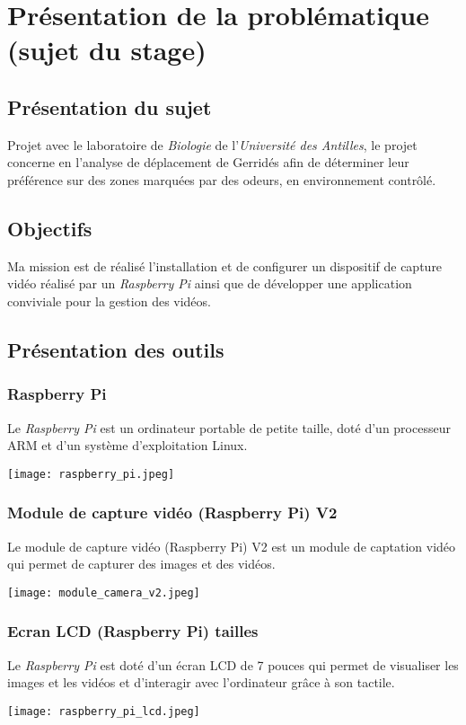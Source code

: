 \chapter{Présentation de la problématique (sujet du stage)}
\minitoc
    \section{Présentation du sujet}
    Projet avec le laboratoire de \textit{Biologie} de l'\textit{Université des Antilles}, le projet concerne en l'analyse de déplacement de Gerridés afin de déterminer leur préférence sur des zones marquées par des odeurs, en environnement contrôlé.

    \section{Objectifs}
    Ma mission est de réalisé l'installation et de configurer un dispositif de capture vidéo réalisé par un \textit{Raspberry Pi} ainsi que de développer une application conviviale pour la gestion des vidéos.

    \section{Présentation des outils}
        \subsection{Raspberry Pi}
        Le \textit{Raspberry Pi} est un ordinateur portable de petite taille, doté d'un processeur ARM et d'un système d'exploitation Linux.
        \begin{center}
            \texttt{[image: raspberry\_pi.jpeg]}
        \end{center}
        \subsection{Module de capture vidéo (Raspberry Pi) V2}
        Le module de capture vidéo (Raspberry Pi) V2 est un module de captation vidéo qui permet de capturer des images et des vidéos.
        \begin{center}
            \texttt{[image: module\_camera\_v2.jpeg]}
        \end{center}

        
        \subsection{Ecran LCD (Raspberry Pi) tailles}
        Le \textit{Raspberry Pi} est doté d'un écran LCD de 7 pouces qui permet de visualiser les images et les vidéos et d'interagir avec l'ordinateur grâce à son tactile. 
        \begin{center}
            \texttt{[image: raspberry\_pi\_lcd.jpeg]}
        \end{center}

